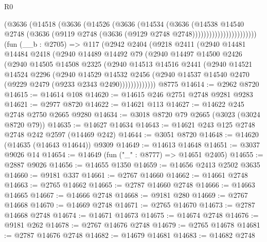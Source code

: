 \begin{lexlean}{R0}
\begin{coremodule}
                          (@3636
                            (@14518
                              (@3636
                                (@14526
                                  (@3636
                                    (@14534
                                      (@3636
                                        (@14538
                                          @14540
                                          @2748
                                          (@3636
                                            (@9119
                                              @2748
                                              (@3636 (@9129 @2748 @2748)))))))))))))))))))))))
    (fun (__b : @2705) =>
    @117
      (@2942
        @2404
        (@9218
          @2411
          (@2940
            @14481
            @14484
            @2418
            (@2940
              @14489
              @14492
              @79
              (@2940
                @14497
                @14500
                @2426
                (@2940
                  @14505
                  @14508
                  @2325
                  (@2940
                    @14513
                    @14516
                    @2441
                    (@2940
                      @14521
                      @14524
                      @2296
                      (@2940
                        @14529
                        @14532
                        @2456
                        (@2940 @14537 @14540 @2470 (@9229 @2479 (@9233 @2343 @2490)))))))))))))
    @8775
@14614 := @2962 @8720
@14615 := @14614 @108
@14620 := @14615 @246 @2751 @2748 @9281 @9283
@14621 := @2977 @8720
@14622 := @14621 @113
@14627 := @14622 @245 @2748 @2750 @2665 @9280
@14634 := @3018 @8720 @79 @2665 (@3023 (@3024 @8720 @79))
@14635 := @14627 @14634
@14643 := @14621 @243 @125 @2748 @2748 @242 @2597 (@14469 @242)
@14644 := @3051 @8720
@14648 := @14620 (@14635 (@14643 @14644)) @9309
@14649 := @14613 @14648
@14651 := @3037 @9026 @14
@14654 := @14649 (fun ("_" : @8777) => @14651 @2405)
@14655 := @2887 @9026
@14656 := @14655 @1350
@14659 := @14656 @2413 @2502 @3635
@14660 := @9181 @337
@14661 := @2767 @14660
@14662 := @14661 @2748
@14663 := @2765 @14662
@14665 := @2787 @14660 @2748
@14666 := @14663 @14665
@14667 := @14666 @2748
@14668 := @9181 @280
@14669 := @2767 @14668
@14670 := @14669 @2748
@14671 := @2765 @14670
@14673 := @2787 @14668 @2748
@14674 := @14671 @14673
@14675 := @14674 @2748
@14676 := @9181 @262
@14678 := @2767 @14676 @2748
@14679 := @2765 @14678
@14681 := @2787 @14676 @2748
@14682 := @14679 @14681
@14683 := @14682 @2748

\end{coremodule}
\end{lexlean}
